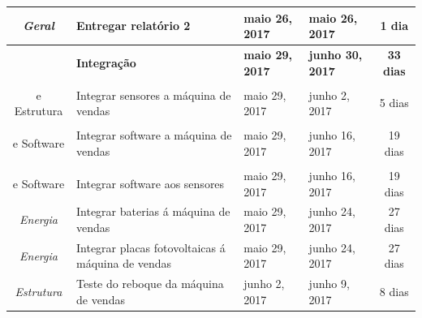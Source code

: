\begin{longtable}{|c|m{6.5cm}|m{3.2cm}|m{3.2cm}|c|}
\textit{Geral}                                                            & Entregar relatório 2                                 & maio 26, 2017                        & maio 26, 2017                     & 1 dia                                 \\ \hline
\textit{}                                                                 & \textbf{Integração}                                  & \textbf{maio 29, 2017}               & \textbf{junho 30, 2017}           & \textbf{33 dias}                      \\ \hline
\textit{\begin{tabular}[c]{@{}c@{}}Eletrônica\\ e Estrutura\end{tabular}} & Integrar sensores a máquina de vendas                        & maio 29, 2017                        & junho 2, 2017                     & 5 dias                                \\ \hline
\textit{\begin{tabular}[c]{@{}c@{}}Eletrônica\\ e Software\end{tabular}}  & Integrar software a máquina de vendas                     & maio 29, 2017                        & junho 16, 2017                    & 19 dias                               \\ \hline
\textit{\begin{tabular}[c]{@{}c@{}}Eletrônica\\ e Software\end{tabular}}  & Integrar software aos sensores                       & maio 29, 2017                        & junho 16, 2017                    & 19 dias                               \\ \hline
\textit{Energia}                                                          & Integrar baterias á máquina de vendas                         & maio 29, 2017                        & junho 24, 2017                    & 27 dias                               \\ \hline
\textit{Energia}                                                          & Integrar placas fotovoltaicas á máquina de vendas            & maio 29, 2017                        & junho 24, 2017                    & 27 dias                               \\ \hline
\textit{Estrutura}                                                        & Teste do reboque da máquina de vendas                        & junho 2, 2017                        & junho 9, 2017                     & 8 dias                                \\ \hline

\end{longtable}
